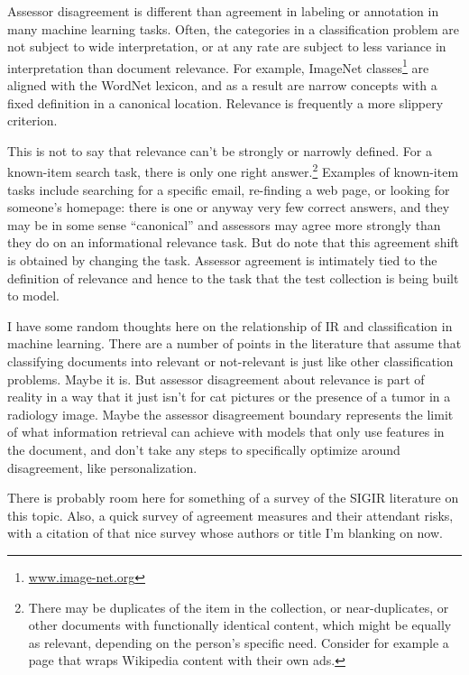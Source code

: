 \documentclass[nobib]{tufte-book}
\begin{document}
Assessor disagreement is different than agreement in labeling or annotation in many machine learning tasks.  Often, the categories in a classification problem are not subject to wide interpretation, or at any rate are subject to less variance in interpretation than document relevance.  For example, ImageNet classes\footnote{\url{www.image-net.org}} are aligned with the WordNet lexicon, and as a result are narrow concepts with a fixed definition in a canonical location.  Relevance is frequently a more slippery criterion.

This is not to say that relevance can't be strongly or narrowly defined.  For a known-item search task, there is only one right answer.\footnote{There may be duplicates of the item in the collection, or near-duplicates, or other documents with functionally identical content, which might be equally as relevant, depending on the person's specific need.  Consider for example a page that wraps Wikipedia content with their own ads.}  Examples of known-item tasks include searching for a specific email, re-finding a web page, or looking for someone's homepage: there is one or anyway very few correct answers, and they may be in some sense ``canonical'' and assessors may agree more strongly than they do on an informational relevance task.  But do note that this agreement shift is obtained by changing the task.  Assessor agreement is intimately tied to the definition of relevance and hence to the task that the test collection is being built to model.

I have some random thoughts here on the relationship of IR and classification in machine learning. There are a number of points in the literature that assume that classifying documents into relevant or not-relevant is just like other classification problems.  Maybe it is.  But assessor disagreement about relevance is part of reality in a way that it just isn't for cat pictures or the presence of a tumor in a radiology image.  Maybe the assessor disagreement boundary represents the limit of what information retrieval can achieve with models that only use features in the document, and don't take any steps to specifically optimize around disagreement, like personalization.

There is probably room here for something of a survey of the SIGIR literature on this topic.  Also, a quick survey of agreement measures and their attendant risks, with a citation of that nice survey whose authors or title I'm blanking on now.
\end{document}
